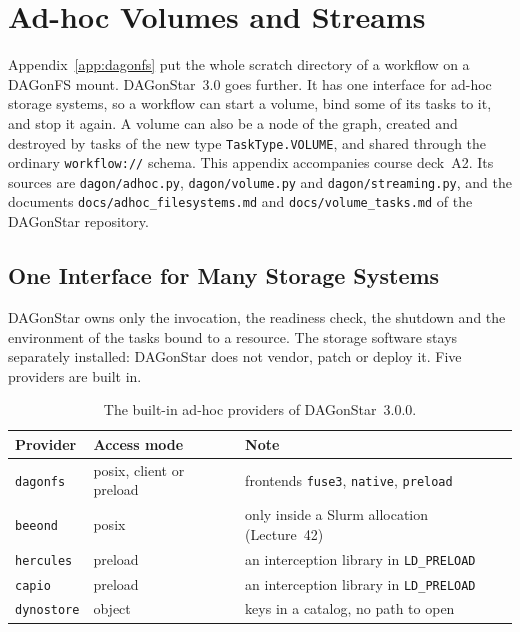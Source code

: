 \chapter{Ad-hoc Volumes and Streams}
\label{app:volumes}

Appendix~\ref{app:dagonfs} put the whole scratch directory of a workflow on a
DAGonFS mount. DAGonStar~3.0 goes further. It has one interface for ad-hoc
storage systems, so a workflow can start a volume, bind some of its tasks to
it, and stop it again. A volume can also be a node of the graph, created and
destroyed by tasks of the new type \texttt{TaskType.VOLUME}, and shared through
the ordinary \texttt{workflow://} schema. This appendix accompanies course
deck~A2. Its sources are \texttt{dagon/adhoc.py}, \texttt{dagon/volume.py} and
\texttt{dagon/streaming.py}, and the documents
\texttt{docs/adhoc\_filesystems.md} and \texttt{docs/volume\_tasks.md} of the
DAGonStar repository.

\section{One Interface for Many Storage Systems}

DAGonStar owns only the invocation, the readiness check, the shutdown and the
environment of the tasks bound to a resource. The storage software stays
separately installed: DAGonStar does not vendor, patch or deploy it. Five
providers are built in.

\begin{table}[h]
\centering
\begin{tabular}{@{}lll@{}}
\toprule
Provider & Access mode & Note \\
\midrule
\texttt{dagonfs} & posix, client or preload & frontends \texttt{fuse3}, \texttt{native}, \texttt{preload} \\
\texttt{beeond} & posix & only inside a Slurm allocation (Lecture~42) \\
\texttt{hercules} & preload & an interception library in \texttt{LD\_PRELOAD} \\
\texttt{capio} & preload & an interception library in \texttt{LD\_PRELOAD} \\
\texttt{dynostore} & object & keys in a catalog, no path to open \\
\bottomrule
\end{tabular}
\caption{The built-in ad-hoc providers of DAGonStar~3.0.0.}
\label{tab:adhoc-providers}
\end{table}

